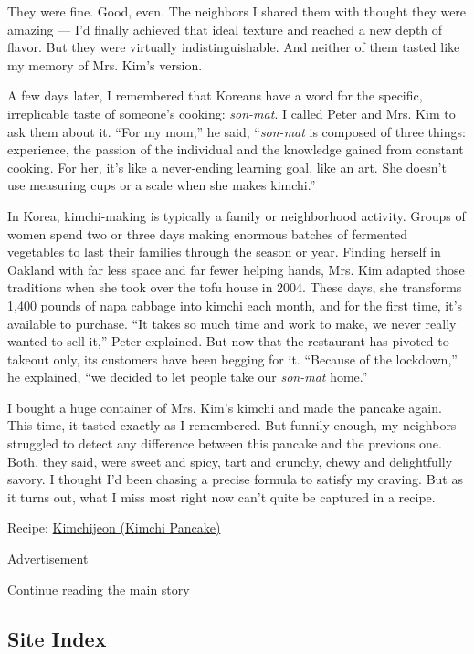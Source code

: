 They were fine. Good, even. The neighbors I shared them with thought
they were amazing --- I'd finally achieved that ideal texture and
reached a new depth of flavor. But they were virtually
indistinguishable. And neither of them tasted like my memory of Mrs.
Kim's version.

A few days later, I remembered that Koreans have a word for the
specific, irreplicable taste of someone's cooking: \emph{son-mat}. I
called Peter and Mrs. Kim to ask them about it. ``For my mom,'' he said,
``\emph{son-mat} is composed of three things: experience, the passion of
the individual and the knowledge gained from constant cooking. For her,
it's like a never-ending learning goal, like an art. She doesn't use
measuring cups or a scale when she makes kimchi.''

In Korea, kimchi-making is typically a family or neighborhood activity.
Groups of women spend two or three days making enormous batches of
fermented vegetables to last their families through the season or year.
Finding herself in Oakland with far less space and far fewer helping
hands, Mrs. Kim adapted those traditions when she took over the tofu
house in 2004. These days, she transforms 1,400 pounds of napa cabbage
into kimchi each month, and for the first time, it's available to
purchase. ``It takes so much time and work to make, we never really
wanted to sell it,'' Peter explained. But now that the restaurant has
pivoted to takeout only, its customers have been begging for it.
``Because of the lockdown,'' he explained, ``we decided to let people
take our \emph{son-mat} home.''

I bought a huge container of Mrs. Kim's kimchi and made the pancake
again. This time, it tasted exactly as I remembered. But funnily enough,
my neighbors struggled to detect any difference between this pancake and
the previous one. Both, they said, were sweet and spicy, tart and
crunchy, chewy and delightfully savory. I thought I'd been chasing a
precise formula to satisfy my craving. But as it turns out, what I miss
most right now can't quite be captured in a recipe.

Recipe:
\href{https://cooking.nytimes3xbfgragh.onion/recipes/1021158-kimchijeon-kimchi-pancake}{Kimchijeon
(Kimchi Pancake)}

Advertisement

\protect\hyperlink{after-bottom}{Continue reading the main story}

\hypertarget{site-index}{%
\subsection{Site Index}\label{site-index}}

